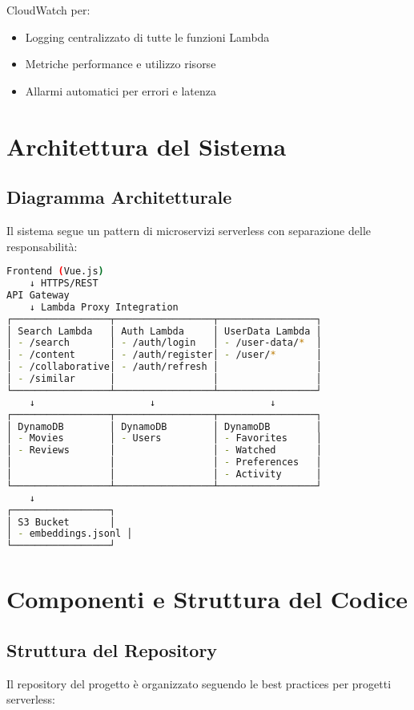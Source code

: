 \documentclass[11pt,a4paper]{article}
\begin{document}
\begin{description}[style=nextline, leftmargin=0cm, itemsep=0.5em]
  \item[Monitoring \& Observability] CloudWatch per:
    \begin{itemize}
      \item Logging centralizzato di tutte le funzioni Lambda
      \item Metriche performance e utilizzo risorse
      \item Allarmi automatici per errori e latenza
    \end{itemize}
\end{description}

\section{Architettura del Sistema}

\subsection{Diagramma Architetturale}
Il sistema segue un pattern di microservizi serverless con separazione delle responsabilità:

\begin{lstlisting}[language=bash, caption=Flusso di Comunicazione del Sistema]
Frontend (Vue.js) 
    ↓ HTTPS/REST
API Gateway 
    ↓ Lambda Proxy Integration
┌─────────────────┬─────────────────┬─────────────────┐
│ Search Lambda   │ Auth Lambda     │ UserData Lambda │
│ - /search       │ - /auth/login   │ - /user-data/*  │
│ - /content      │ - /auth/register│ - /user/*       │
│ - /collaborative│ - /auth/refresh │                 │
│ - /similar      │                 │                 │
└─────────────────┴─────────────────┴─────────────────┘
    ↓                    ↓                    ↓
┌─────────────────┬─────────────────┬─────────────────┐
│ DynamoDB        │ DynamoDB        │ DynamoDB        │
│ - Movies        │ - Users         │ - Favorites     │
│ - Reviews       │                 │ - Watched       │
│                 │                 │ - Preferences   │
│                 │                 │ - Activity      │
└─────────────────┴─────────────────┴─────────────────┘
    ↓
┌─────────────────┐
│ S3 Bucket       │
│ - embeddings.jsonl │
└─────────────────┘
\end{lstlisting}

\section{Componenti e Struttura del Codice}
\subsection{Struttura del Repository}
Il repository del progetto è organizzato seguendo le best practices per progetti serverless:
\end{document}
